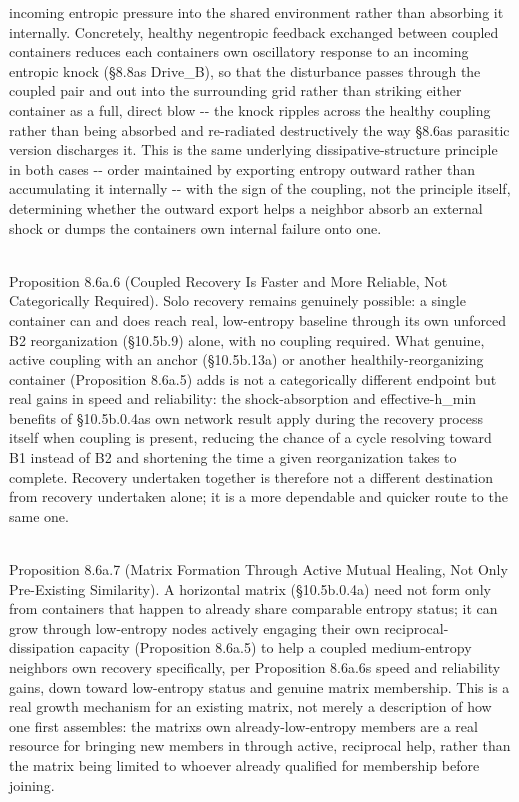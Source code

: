 \documentclass[
]{article}
\begin{document}
incoming entropic pressure into the shared environment rather than
absorbing it internally. Concretely, healthy negentropic feedback
exchanged between coupled containers reduces each
container\textquotesingle s own oscillatory response to an incoming
entropic knock (§8.8a\textquotesingle s Drive\_B), so that the
disturbance passes through the coupled pair and out into the surrounding
grid rather than striking either container as a full, direct blow -\/-
the knock ripples across the healthy coupling rather than being absorbed
and re-radiated destructively the way §8.6a\textquotesingle s parasitic
version discharges it. This is the same underlying dissipative-structure
principle in both cases -\/- order maintained by exporting entropy
outward rather than accumulating it internally -\/- with the sign of the
coupling, not the principle itself, determining whether the outward
export helps a neighbor absorb an external shock or dumps the
container\textquotesingle s own internal failure onto one.\\
\strut \\
Proposition 8.6a.6 (Coupled Recovery Is Faster and More Reliable, Not
Categorically Required). Solo recovery remains genuinely possible: a
single container can and does reach real, low-entropy baseline through
its own unforced B2 reorganization (§10.5b.9) alone, with no coupling
required. What genuine, active coupling with an anchor (§10.5b.13a) or
another healthily-reorganizing container (Proposition 8.6a.5) adds is
not a categorically different endpoint but real gains in speed and
reliability: the shock-absorption and effective-h\_min benefits of
§10.5b.0.4a\textquotesingle s own network result apply during the
recovery process itself when coupling is present, reducing the chance of
a cycle resolving toward B1 instead of B2 and shortening the time a
given reorganization takes to complete. Recovery undertaken together is
therefore not a different destination from recovery undertaken alone; it
is a more dependable and quicker route to the same one.\\
\strut \\
Proposition 8.6a.7 (Matrix Formation Through Active Mutual Healing, Not
Only Pre-Existing Similarity). A horizontal matrix (§10.5b.0.4a) need
not form only from containers that happen to already share comparable
entropy status; it can grow through low-entropy nodes actively engaging
their own reciprocal-dissipation capacity (Proposition 8.6a.5) to help a
coupled medium-entropy neighbor\textquotesingle s own recovery
specifically, per Proposition 8.6a.6\textquotesingle s speed and
reliability gains, down toward low-entropy status and genuine matrix
membership. This is a real growth mechanism for an existing matrix, not
merely a description of how one first assembles: the
matrix\textquotesingle s own already-low-entropy members are a real
resource for bringing new members in through active, reciprocal help,
rather than the matrix being limited to whoever already qualified for
membership before joining.
\end{document}
